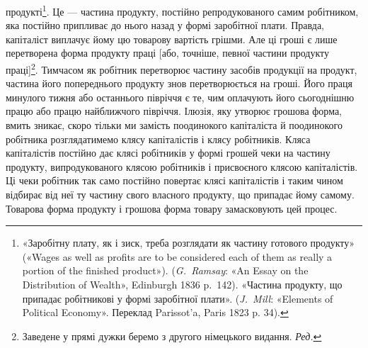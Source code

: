 \parcont{}  %
продукті\footnote{
«Заробітну плату, як і зиск, треба розглядати як частину готового
продукту» («Wages as well as profits are to be considered each of
them as really a portion of the finished product»). (\emph{G.~Ramsay}: «An Essay
on the Distribution of Wealth», Edinburgh 1836 p.~142). «Частина продукту,
що припадає робітникові у формі заробітної плати». (\emph{J.~Mill}:
«Elements of Political Economy». Переклад Parissot’a, Paris 1823 p. 34).
}. Це — частина продукту, постійно репродукованого
самим робітником, яка постійно припливає до нього назад у
формі заробітної плати. Правда, капіталіст виплачує йому цю
товарову вартість грішми. Але ці гроші є лише перетворена форма
продукту праці [або, точніше, певної частини продукту праці]\footnote*{
Заведене у прямі дужки беремо з другого німецького видання. \emph{Ред.}
}.
Тимчасом як робітник перетворює частину засобів продукції
на продукт, частина його попереднього продукту знов перетворюється
на гроші. Його праця минулого тижня або останнього
півріччя є те, чим оплачують його сьогоднішню працю або працю
найближчого півріччя. Ілюзія, яку утворює грошова форма,
вмить зникає, скоро тільки ми замість поодинокого капіталіста
й поодинокого робітника розглядатимемо клясу капіталістів і
клясу робітників. Кляса капіталістів постійно дає клясі робітників
у формі грошей чеки на частину продукту, випродукованого
клясою робітників і присвоєного клясою капіталістів. Ці
чеки робітник так само постійно повертає клясі капіталістів і
таким чином відбирає від неї ту частину свого власного продукту,
що припадає йому самому. Товарова форма продукту і грошова
форма товару замасковують цей процес.

